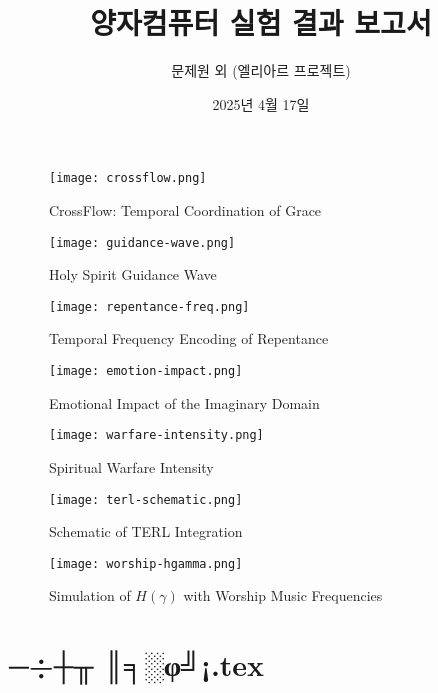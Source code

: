 \documentclass[12pt]{article}
\begin{document}
{{{\begin{figure}[H]
\centering
\texttt{[image: crossflow.png]}
\caption{CrossFlow: Temporal Coordination of Grace}
\end{figure}

\begin{figure}[H]
\centering
\texttt{[image: guidance-wave.png]}
\caption{Holy Spirit Guidance Wave}
\end{figure}

\begin{figure}[H]
\centering
\texttt{[image: repentance-freq.png]}
\caption{Temporal Frequency Encoding of Repentance}
\end{figure}

\begin{figure}[H]
\centering
\texttt{[image: emotion-impact.png]}
\caption{Emotional Impact of the Imaginary Domain}
\end{figure}

\begin{figure}[H]
\centering
\texttt{[image: warfare-intensity.png]}
\caption{Spiritual Warfare Intensity}
\end{figure}

\begin{figure}[H]
\centering
\texttt{[image: terl-schematic.png]}
\caption{Schematic of TERL Integration}
\end{figure}

\begin{figure}[H]
\centering
\texttt{[image: worship-hgamma.png]}
\caption{Simulation of $H(\gamma)$ with Worship Music Frequencies}
\end{figure}



\newpage
\section*{─÷┼╥ ║╕░φ╝¡.tex}

\usepackage{kotex}
\usepackage{amsmath,amssymb}
\usepackage{geometry}
\geometry{a4paper, margin=1in}
\title{양자컴퓨터 실험 결과 보고서}
\author{문제원 외 (엘리아르 프로젝트)}
\date{2025년 4월 17일}


\maketitle

}}}
\end{document}
